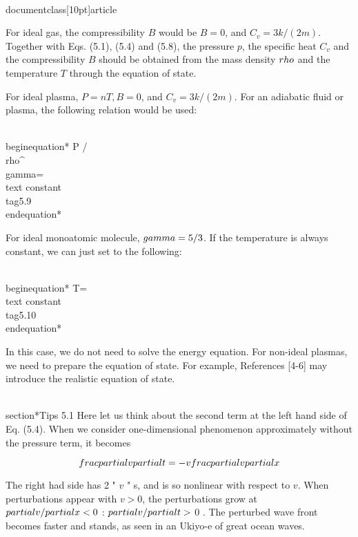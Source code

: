 \\documentclass[10pt]{article}
\begin{document}
For ideal gas, the compressibility $B$ would be $B=0$, and $C_{v}=3 k /(2 m)$. Together with Eqs. (5.1), (5.4) and (5.8), the pressure $p$, the specific heat $C_{v}$ and the compressibility $B$ should be obtained from the mass density $\\rho$ and the temperature $T$ through the equation of state.

For ideal plasma, $P=n T, B=0$, and $C_{v}=3 k /(2 m)$. For an adiabatic fluid or plasma, the following relation would be used:


\\begin{equation*}
P / \\rho^{\\gamma}=\\text { constant } \\tag{5.9}
\\end{equation*}


For ideal monoatomic molecule, $\\gamma=5 / 3$. If the temperature is always constant, we can just set to the following:


\\begin{equation*}
T=\\text { constant } \\tag{5.10}
\\end{equation*}


In this case, we do not need to solve the energy equation. For non-ideal plasmas, we need to prepare the equation of state. For example, References [4-6] may introduce the realistic equation of state.

\\section*{Tips 5.1}
Here let us think about the second term at the left hand side of Eq. (5.4). When we consider one-dimensional phenomenon approximately without the pressure term, it becomes

$$
\\frac{\\partial v}{\\partial t}=-v \\frac{\\partial v}{\\partial x}
$$

The right had side has 2 " $v$ " s, and is so nonlinear with respect to $v$. When perturbations appear with $v>0$, the perturbations grow at $\\partial v / \\partial x<0$ : $\\partial v / \\partial t>$ 0 . The perturbed wave front becomes faster and stands, as seen in an Ukiyo-e of great ocean waves.
\end{document}
